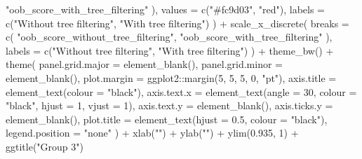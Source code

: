 \documentclass[
  11pt,
  oneside]{book}
\newenvironment{Shaded}{\begin{snugshade}}{\end{snugshade}}
\newcommand{\AttributeTok}[1]{\textcolor[rgb]{0.77,0.63,0.00}{#1}}
\newcommand{\DecValTok}[1]{\textcolor[rgb]{0.00,0.00,0.81}{#1}}
\newcommand{\FloatTok}[1]{\textcolor[rgb]{0.00,0.00,0.81}{#1}}
\newcommand{\FunctionTok}[1]{\textcolor[rgb]{0.00,0.00,0.00}{#1}}
\newcommand{\NormalTok}[1]{#1}
\newcommand{\SpecialCharTok}[1]{\textcolor[rgb]{0.00,0.00,0.00}{#1}}
\newcommand{\StringTok}[1]{\textcolor[rgb]{0.31,0.60,0.02}{#1}}
\begin{document}
\begin{Shaded}
\begin{Highlighting}[]
      \StringTok{"oob\_score\_with\_tree\_filtering"}
\NormalTok{    ),}
    \AttributeTok{values =} \FunctionTok{c}\NormalTok{(}\StringTok{"\#fc9d03"}\NormalTok{, }\StringTok{"red"}\NormalTok{),}
    \AttributeTok{labels =} \FunctionTok{c}\NormalTok{(}\StringTok{"Without tree filtering"}\NormalTok{, }\StringTok{"With tree filtering"}\NormalTok{)}
\NormalTok{  ) }\SpecialCharTok{+}
  \FunctionTok{scale\_x\_discrete}\NormalTok{(}
    \AttributeTok{breaks =} \FunctionTok{c}\NormalTok{(}
      \StringTok{"oob\_score\_without\_tree\_filtering"}\NormalTok{,}
      \StringTok{"oob\_score\_with\_tree\_filtering"}
\NormalTok{    ),}
    \AttributeTok{labels =} \FunctionTok{c}\NormalTok{(}\StringTok{"Without tree filtering"}\NormalTok{, }\StringTok{"With tree filtering"}\NormalTok{)}
\NormalTok{  ) }\SpecialCharTok{+}
  \FunctionTok{theme\_bw}\NormalTok{() }\SpecialCharTok{+}
  \FunctionTok{theme}\NormalTok{(}
    \AttributeTok{panel.grid.major =} \FunctionTok{element\_blank}\NormalTok{(),}
    \AttributeTok{panel.grid.minor =} \FunctionTok{element\_blank}\NormalTok{(),}
    \AttributeTok{plot.margin =}\NormalTok{ ggplot2}\SpecialCharTok{::}\FunctionTok{margin}\NormalTok{(}\DecValTok{5}\NormalTok{, }\DecValTok{5}\NormalTok{, }\DecValTok{5}\NormalTok{, }\DecValTok{0}\NormalTok{, }\StringTok{"pt"}\NormalTok{),}
    \AttributeTok{axis.title =} \FunctionTok{element\_text}\NormalTok{(}\AttributeTok{colour =} \StringTok{"black"}\NormalTok{),}
    \AttributeTok{axis.text.x =} \FunctionTok{element\_text}\NormalTok{(}\AttributeTok{angle =} \DecValTok{30}\NormalTok{, }\AttributeTok{colour =} \StringTok{"black"}\NormalTok{, }\AttributeTok{hjust =} \DecValTok{1}\NormalTok{, }\AttributeTok{vjust =} \DecValTok{1}\NormalTok{),}
    \AttributeTok{axis.text.y =} \FunctionTok{element\_blank}\NormalTok{(),}
    \AttributeTok{axis.ticks.y =} \FunctionTok{element\_blank}\NormalTok{(),}
    \AttributeTok{plot.title =} \FunctionTok{element\_text}\NormalTok{(}\AttributeTok{hjust =} \FloatTok{0.5}\NormalTok{, }\AttributeTok{colour =} \StringTok{"black"}\NormalTok{),}
    \AttributeTok{legend.position =} \StringTok{"none"}
\NormalTok{  ) }\SpecialCharTok{+}
  \FunctionTok{xlab}\NormalTok{(}\StringTok{""}\NormalTok{) }\SpecialCharTok{+}
  \FunctionTok{ylab}\NormalTok{(}\StringTok{""}\NormalTok{) }\SpecialCharTok{+}
  \FunctionTok{ylim}\NormalTok{(}\FloatTok{0.935}\NormalTok{, }\DecValTok{1}\NormalTok{) }\SpecialCharTok{+}
  \FunctionTok{ggtitle}\NormalTok{(}\StringTok{"Group 3"}\NormalTok{)}
\end{Highlighting}
\end{Shaded}
\end{document}

